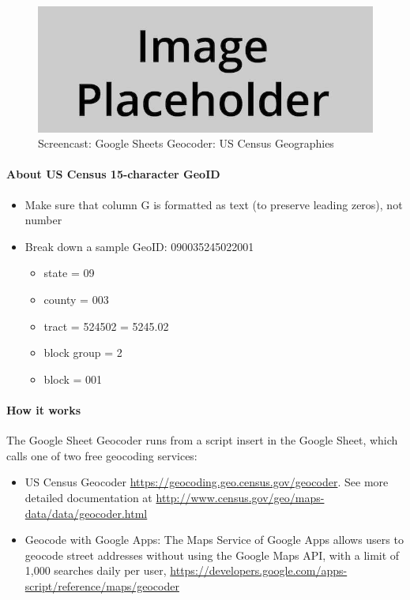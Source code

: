 \documentclass[
  english,
]{book}
\providecommand{\tightlist}{%
  \setlength{\itemsep}{0pt}\setlength{\parskip}{0pt}}
\begin{document}
\begin{figure}
\centering
\includegraphics{images/placeholder.jpg}
\caption{\label{fig:googlesheets-geocoder2}Screencast: Google Sheets Geocoder: US Census Geographies}
\end{figure}

\hypertarget{about-us-census-15-character-geoid}{%
\paragraph{About US Census 15-character GeoID}\label{about-us-census-15-character-geoid}}

\begin{itemize}
\tightlist
\item
  Make sure that column G is formatted as text (to preserve leading zeros), not number
\item
  Break down a sample GeoID: 090035245022001

  \begin{itemize}
  \tightlist
  \item
    state = 09
  \item
    county = 003
  \item
    tract = 524502 = 5245.02
  \item
    block group = 2
  \item
    block = 001
  \end{itemize}
\end{itemize}

\hypertarget{how-it-works}{%
\paragraph{How it works}\label{how-it-works}}

The Google Sheet Geocoder runs from a script insert in the Google Sheet, which calls one of two free geocoding services:

\begin{itemize}
\tightlist
\item
  US Census Geocoder \url{https://geocoding.geo.census.gov/geocoder}. See more detailed documentation at \url{http://www.census.gov/geo/maps-data/data/geocoder.html}
\item
  Geocode with Google Apps: The Maps Service of Google Apps allows users to geocode street addresses without using the Google Maps API, with a limit of 1,000 searches daily per user, \url{https://developers.google.com/apps-script/reference/maps/geocoder}
\end{itemize}
\end{document}
